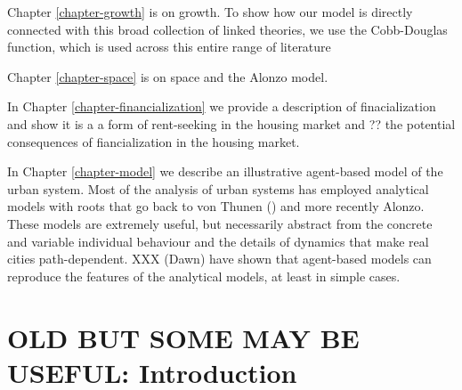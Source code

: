 Chapter \ref{chapter-growth} is on growth. To show how our model is directly connected with this broad collection of linked theories, we use the Cobb-Douglas function, which is used across this entire range of literature 



Chapter \ref{chapter-space} is on space and the Alonzo model.

In Chapter \ref{chapter-financialization} we  provide a description of finacialization and show it is a a form of rent-seeking in the housing market and ?? the potential consequences of fiancialization in the housing market. 

In Chapter \ref{chapter-model} we  describe an illustrative agent-based model of the urban system. Most of the analysis of urban systems has employed analytical models with roots that go back to von Thunen () and more recently Alonzo. These models are extremely useful, but necessarily abstract from the concrete  and variable individual behaviour and  the details  of dynamics that make real cities path-dependent. XXX (Dawn) have shown that agent-based models can reproduce the features of the analytical models, at least in simple cases. 





\section{OLD BUT SOME MAY BE USEFUL: Introduction}


